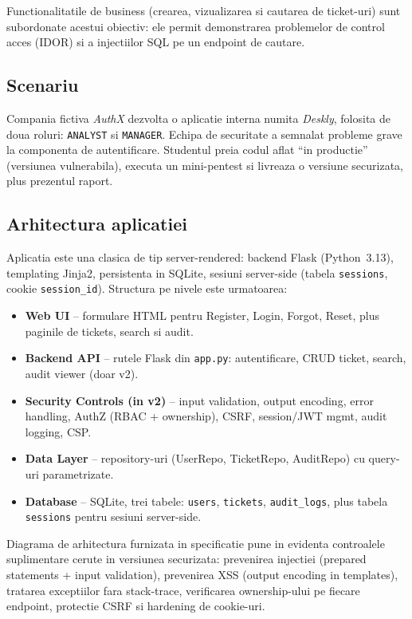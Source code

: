 \documentclass[12pt,a4paper]{article}
\begin{document}
Functionalitatile de business (crearea, vizualizarea si cautarea de
ticket-uri) sunt subordonate acestui obiectiv: ele permit demonstrarea
problemelor de control acces (IDOR) si a injectiilor SQL pe un endpoint
de cautare.

\subsection{Scenariu}
Compania fictiva \textit{AuthX} dezvolta o aplicatie interna numita
\textit{Deskly}, folosita de doua roluri: \texttt{ANALYST} si
\texttt{MANAGER}. Echipa de securitate a semnalat probleme grave la
componenta de autentificare. Studentul preia codul aflat ``in productie''
(versiunea vulnerabila), executa un mini-pentest si livreaza o versiune
securizata, plus prezentul raport.

\subsection{Arhitectura aplicatiei}
Aplicatia este una clasica de tip server-rendered: backend Flask
(Python~3.13), templating Jinja2, persistenta in SQLite, sesiuni
server-side (tabela \texttt{sessions}, cookie \texttt{session\_id}).
Structura pe nivele este urmatoarea:

\begin{itemize}
  \item \textbf{Web UI} -- formulare HTML pentru Register, Login,
        Forgot, Reset, plus paginile de tickets, search si audit.
  \item \textbf{Backend API} -- rutele Flask din \texttt{app.py}:
        autentificare, CRUD ticket, search, audit viewer (doar v2).
  \item \textbf{Security Controls (in v2)} -- input validation, output
        encoding, error handling, AuthZ (RBAC + ownership), CSRF,
        session/JWT mgmt, audit logging, CSP.
  \item \textbf{Data Layer} -- repository-uri (UserRepo, TicketRepo,
        AuditRepo) cu query-uri parametrizate.
  \item \textbf{Database} -- SQLite, trei tabele: \texttt{users},
        \texttt{tickets}, \texttt{audit\_logs}, plus tabela
        \texttt{sessions} pentru sesiuni server-side.
\end{itemize}

Diagrama de arhitectura furnizata in specificatie pune in evidenta
controalele suplimentare cerute in versiunea securizata: prevenirea
injectiei (prepared statements + input validation), prevenirea XSS
(output encoding in templates), tratarea exceptiilor fara stack-trace,
verificarea ownership-ului pe fiecare endpoint, protectie CSRF si
hardening de cookie-uri.
\end{document}
